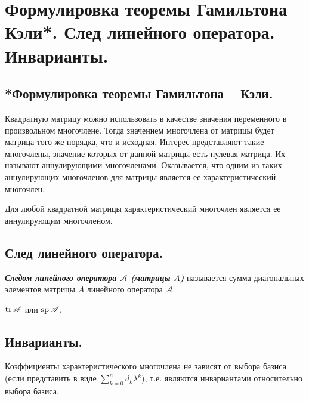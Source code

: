 \section{
    Формулировка теоремы Гамильтона – Кэли*. След линейного оператора. Инварианты.
}

\subsection{
    *Формулировка теоремы Гамильтона – Кэли.
}

Квадратную матрицу можно использовать в качестве значения переменного в произвольном многочлене. Тогда значением многочлена от матрицы будет матрица того же порядка, что и исходная. Интерес представляют такие многочлены, значение которых от данной матрицы есть нулевая матрица. Их называют аннулирующими многочленами. Оказывается, что одним из таких аннулирующих многочленов для матрицы является ее характеристический многочлен.

\begin{theorem}
    Для любой квадратной матрицы характеристический многочлен является ее аннулирующим многочленом.
\end{theorem}

\subsection{
    След линейного оператора.
}

\begin{definition}
    \textbf{\textit{Следом линейного оператора $\mathscr{A}$ (матрицы $A$)}} называется сумма диагональных элементов матрицы $A$ линейного оператора $\mathscr{A}$.
\end{definition}

\begin{designation}
    $\operatorname{\mathop{\mathrm{tr}}} \mathscr{A}$ или $\operatorname{\mathop{\mathrm{sp}}} \mathscr{A}$.
\end{designation}

\subsection{
    Инварианты.
}

Коэффициенты характеристического многочлена не зависят от выбора базиса (если представить в виде $\sum_{k=0}^{n} d_k \lambda^k
$), т.е. являются инвариантами относительно выбора базиса.

\begin{comment}
    Наиболее просто выражается коэффициент $d_{n - 1} = \tr \mathscr{A}$.
\end{comment}

\begin{comment}
    Коэффициент $d_0$ характеристического многочлена совпадает со значением этого многочлена при $\lambda = 0$ и равен определителю линейного оператора $\mathscr{A}$.
\end{comment}

